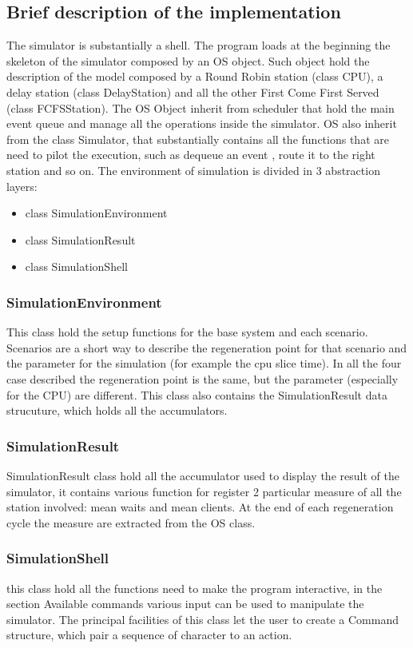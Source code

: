 \documentclass[12pt,a4paper]{article}
\begin{document}
\subsection{Brief description of the implementation}
The simulator is substantially a shell. The program loads at the beginning the skeleton of the simulator composed by an OS object. Such object hold the description of the model composed by a Round Robin station (class CPU), a delay station (class DelayStation) and all the other First Come First Served (class FCFSStation). The OS Object inherit from scheduler that hold the main event queue and manage all the operations inside the simulator. OS also inherit from the class Simulator, that substantially contains all the functions that are need to pilot the execution, such as dequeue an event , route it to the right station and so on. The environment of simulation is divided in 3 abstraction layers:
\begin{itemize}
    \item class SimulationEnvironment
    \item class SimulationResult
    \item class SimulationShell
\end{itemize}
\subsubsection{SimulationEnvironment}
This class hold the setup functions for the base system and each scenario. Scenarios are a short way to describe the regeneration point for that scenario and the parameter for the simulation (for example the cpu slice time). In all the four case described the regeneration point is the same, but the parameter (especially for the CPU) are different. This class also contains the SimulationResult data strucuture, which holds all the accumulators.
\subsubsection{SimulationResult}
SimulationResult class hold all the accumulator used to display the result of the simulator, it contains various function for register 2 particular measure of all the station involved: mean waits and mean clients. At the end of each regeneration cycle the measure are extracted from the OS class.
\subsubsection{SimulationShell}
this class hold all the functions need to make the program interactive, in the section Available commands various input can be used to manipulate the simulator. The principal facilities of this class let the user to create a Command structure, which pair a sequence of character to an action.
\end{document}
